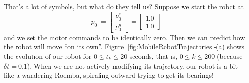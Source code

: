 That's a lot of symbols, but what do they tell us? Suppose we start the robot at 
$$ p_0:= \begin{bmatrix} p^x_0 \\ p^y_0 \end{bmatrix} = \begin{bmatrix} 1.0\\ 1.0 \end{bmatrix}$$
and we set the motor commands to be identically zero. Then we can predict how the robot will move ``on its own''. Figure~\ref{fig:MobileRobotTrajectories}-(a) shows the evolution of our robot for $0 \le t_k \le 20$ seconds, that is, $0 \le k \le 200$ (because $\delta t=0.1$). When we are not actively modifying its trajectory, our robot is a bit like a wandering Roomba, spiraling outward trying to get its bearings! \\


